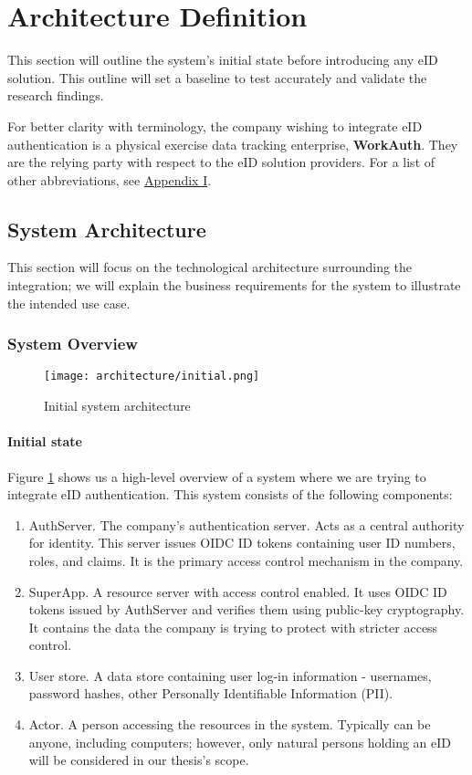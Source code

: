 \section{Architecture Definition}

This section will outline the system's initial state before introducing any eID solution. This outline will set a baseline to test accurately and validate the research findings.

For better clarity with terminology, the company wishing to integrate eID authentication is a physical exercise data tracking enterprise, \textbf{WorkAuth}. They are the relying party with respect to the eID solution providers. For a list of other abbreviations, see \hyperref[appendix:glossary]{Appendix I}.

\subsection{System Architecture}

This section will focus on the technological architecture surrounding the integration; we will explain the business requirements for the system to illustrate the intended use case.

\subsubsection{System Overview}

\begin{figure}
  \centering
  \texttt{[image: architecture/initial.png]}
  \caption{Initial system architecture}
  \label{fig:sys-highlevel}
\end{figure}

\paragraph{Initial state}

Figure \ref{fig:sys-highlevel} shows us a high-level overview of a system where we are trying to integrate eID authentication. This system consists of the following components:

\begin{enumerate}
  \item AuthServer. The company's authentication server. Acts as a central authority for identity. This server issues OIDC ID tokens containing user ID numbers, roles, and claims. It is the primary access control mechanism in the company.
  \item SuperApp. A resource server with access control enabled. It uses OIDC ID tokens issued by AuthServer and verifies them using public-key cryptography. It contains the data the company is trying to protect with stricter access control.
  \item User store. A data store containing user log-in information - usernames, password hashes, other Personally Identifiable Information (PII).
  \item Actor. A person accessing the resources in the system. Typically can be anyone, including computers; however, only natural persons holding an eID will be considered in our thesis's scope.
\end{enumerate}

